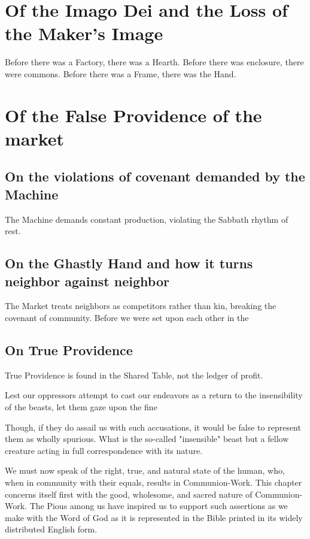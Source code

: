 \documentclass[10pt]{book}
\newcommand{\comment}[1]{}
\begin{document}
\section{Of the Imago Dei and the Loss of the Maker's Image}
Before there was a Factory, there was a Hearth. Before there was enclosure, there were commons. Before there was a Frame, there was the Hand.



\section{Of the False Providence of the market}
\comment{The "Invisible Hand" of the Market is a demonic parody of Divine Providence; it promises life but delivers death, creating a "Witchery" of anxiety and competition that unravels the social fabric.}

\subsection{On the violations of covenant demanded by the Machine}
The Machine demands constant production, violating the Sabbath rhythm of rest.
\subsection{On the Ghastly Hand and how it turns neighbor against neighbor}
	The Market treats neighbors as competitors rather than kin, breaking the covenant of community.
	Before we were set upon each other in the 
\subsection{On True Providence}
	True Providence is found in the Shared Table, not the ledger of profit.
\comment{Scriptural Anchor: Matthew 6:25-34 (Do not worry) and Psalm 115:4-8 (Those who make idols become like them).}
	

Lest our oppressors attempt to cast our endeavors as a return to the insensibility of the beasts, let them gaze upon the fine 

\comment{ Look at Schleiermacher's soliloquies reading from 4-15& 4-22}
Though, if they do assail us with such accusations, it would be false to represent them as wholly spurious. 
What is the so-called "insensible" beast but a fellow creature acting in full correspondence with its nature. 

We must now speak of the right, true, and natural state of the human, who, when in community with their equals, results in Communion-Work.
This chapter concerns itself first with the good, wholesome, and sacred nature of Communion-Work.
The Pious among us have inspired us to support such assertions as we make with the Word of God as it is represented in the Bible printed in its widely distributed English form. \comment{hand-written marginalia: Getting consensus between the priests and the atheists was maddening}
\end{document}
